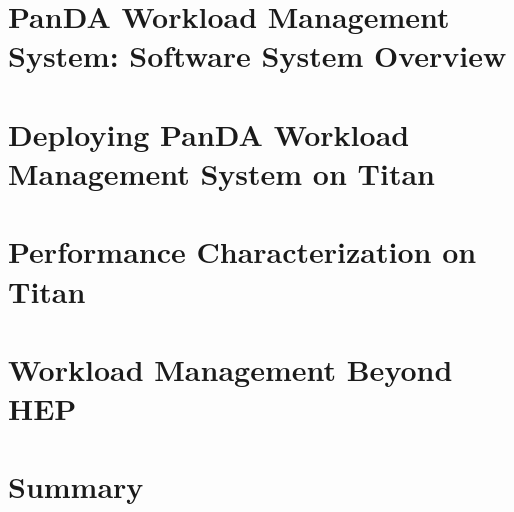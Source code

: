 \documentclass[smallextended]{svjour3}      %
\begin{document}

\section{PanDA Workload Management System: Software System Overview}
\label{sec:overview}



\section{Deploying PanDA Workload Management System on Titan}
\label{sec:deploying}



\section{Performance Characterization on Titan}
\label{sec:performance}



\section{Workload Management Beyond HEP}
\label{sec:beyond_hep}




\section{Summary}
\label{sec:beyond_hep}

\end{document}
